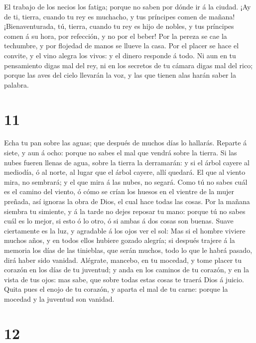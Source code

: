  El trabajo de los necios los fatiga; porque no saben por
dónde ir á la ciudad.  ¡Ay de ti, tierra, cuando tu rey es
muchacho, y tus príncipes comen de mañana! 
¡Bienaventurada, tú, tierra, cuando tu rey es hijo de nobles, y tus
príncipes comen á su hora, por refección, y no por el beber!
 Por la pereza se cae la techumbre, y por flojedad de manos
se llueve la casa.  Por el placer se hace el convite, y el
vino alegra los vivos: y el dinero responde á todo.  Ni aun
en tu pensamiento digas mal del rey, ni en los secretos de tu cámara
digas mal del rico; porque las aves del cielo llevarán la voz, y las que
tienen alas harán saber la palabra.

\hypertarget{section-10}{%
\section{11}\label{section-10}}

 Echa tu pan sobre las aguas; que después de muchos días lo
hallarás.  Reparte á siete, y aun á ocho: porque no sabes el
mal que vendrá sobre la tierra.  Si las nubes fueren llenas
de agua, sobre la tierra la derramarán: y si el árbol cayere al
mediodía, ó al norte, al lugar que el árbol cayere, allí quedará.
 El que al viento mira, no sembrará; y el que mira á las
nubes, no segará.  Como tú no sabes cuál es el camino del
viento, ó cómo se crían los huesos en el vientre de la mujer preñada,
así ignoras la obra de Dios, el cual hace todas las cosas. 
Por la mañana siembra tu simiente, y á la tarde no dejes reposar tu
mano: porque tú no sabes cuál es lo mejor, si esto ó lo otro, ó si ambas
á dos cosas son buenas.  Suave ciertamente es la luz, y
agradable á los ojos ver el sol:  Mas si el hombre viviere
muchos años, y en todos ellos hubiere gozado alegría; si después trajere
á la memoria los días de las tinieblas, que serán muchos, todo lo que le
habrá pasado, dirá haber sido vanidad.  Alégrate, mancebo,
en tu mocedad, y tome placer tu corazón en los días de tu juventud; y
anda en los caminos de tu corazón, y en la vista de tus ojos: mas sabe,
que sobre todas estas cosas te traerá Dios á juicio.  Quita
pues el enojo de tu corazón, y aparta el mal de tu carne: porque la
mocedad y la juventud son vanidad.

\hypertarget{section-11}{%
\section{12}\label{section-11}}

